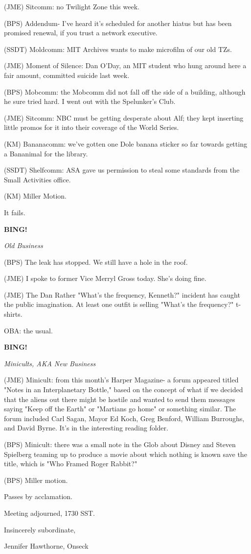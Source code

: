 \documentclass[12pt]{article}
\newcommand{\bing}{{\bf BING!} }
\newcommand{\goto}[1]{\bing \vskip 12pt \centerline{{\em{#1}}}}
\begin{document}
(JME) Sitcomm: no Twilight Zone this week.

(BPS) Addendum- I've heard it's scheduled for another hiatus but has been promised renewal, if you trust a network executive.

(SSDT) Moldcomm: MIT Archives wants to make microfilm of our old TZs.

(JME) Moment of Silence: Dan O'Day, an MIT student who hung around here a fair amount, committed suicide last week.

(BPS) Mobcomm: the Mobcomm did not fall off the side of a building, although he sure tried hard. I went out with the Spelunker's Club.

(JME) Sitcomm: NBC must be getting desperate about Alf; they kept inserting little promos for it into their coverage of the World Series.

(KM) Bananacomm: we've gotten one Dole banana sticker so far towards getting a Bananimal for the library.

(SSDT) Shelfcomm: ASA gave us permission to steal some standards from the Small Activities office.

(KM) Miller Motion.

It fails.

\goto{Old Business}

(BPS) The leak has stopped. We still have a hole in the roof.

(JME) I spoke to former Vice Merryl Gross today. She's doing fine.

(JME) The Dan Rather "What's the frequency, Kenneth?" incident has caught the public imagination. At least one outfit is selling "What's the frequency?" t-shirts.

OBA: the usual.

\goto{Minicults, AKA New Business}

(JME) Minicult: from this month's Harper Magazine- a forum appeared titled "Notes in an Interplanetary Bottle," based on the concept of what if we decided that the aliens out there might be hostile and wanted to send them messages saying "Keep off the Earth" or "Martians go home" or something similar. The forum included Carl Sagan, Mayor Ed Koch, Greg Benford, William Burroughs, and David Byrne. It's in the interesting reading folder.

(BPS) Minicult: there was a small note in the Glob about Disney and Steven Spielberg teaming up to produce a movie about which nothing is known save the title, which is "Who Framed Roger Rabbit?"

(BPS) Miller motion.

Passes by acclamation.

\vspace{12pt}

\noindent
Meeting adjourned, 1730 SST.

\vspace{18pt}

\centerline{Insincerely subordinate,}
\centerline{Jennifer Hawthorne, Onseck}
\end{document}
